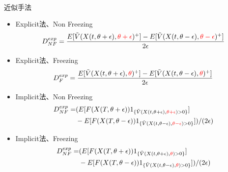 \documentclass[driverfallback=dvipdfmx,cjk]{beamer}
\begin{document}
\begin{frame}
    近似手法 
    \begin{itemize}
        \item Explicit法、Non Freezing
        $$D^{exp}_{NF}= \frac{E[\tilde{V}(X(t,\theta+\epsilon),  \textcolor{red}{\theta + \epsilon})^+] - E[\tilde{V}(X(t,\theta-\epsilon), \textcolor{red}{\theta- \epsilon})^+ ] }{2 \epsilon} $$
        \item Explicit法、Freezing
        $$D^{exp}_{F}= \frac{E[\tilde{V}(X(t,\theta+\epsilon),  \textcolor{red}{\theta})^+] - E[\tilde{V}(X(t,\theta-\epsilon ), \textcolor{red}{\theta})^+ ] }{2 \epsilon} $$
        \item Implicit法、Non Freezing
        \begin{align*}
            D^{exp}_{NF}= &( E[F(X(T, \theta + \epsilon))1_{\{\tilde{V}(X(t,\theta+\epsilon),  \textcolor{red}{\theta+\epsilon}) >0\}}] \\
             & - E[F(X(T, \theta - \epsilon))1_{\{\tilde{V}(X(t,\theta - \epsilon),   \textcolor{red}{\theta- \epsilon}) >0\}}]) / (2 \epsilon)
        \end{align*}
        \item Implicit法、Freezing
        \begin{align*}
            D^{exp}_{NF}= &( E[F(X(T, \theta + \epsilon))1_{\{\tilde{V}(X(t,\theta+\epsilon),  \textcolor{red}{\theta}) >0\}}] \\
             & - E[F(X(T, \theta - \epsilon))1_{\{\tilde{V}(X(t,\theta - \epsilon),  \textcolor{red}{\theta}) >0\}}]) / (2 \epsilon)
        \end{align*}

    \end{itemize}

\end{frame}
\end{document}
